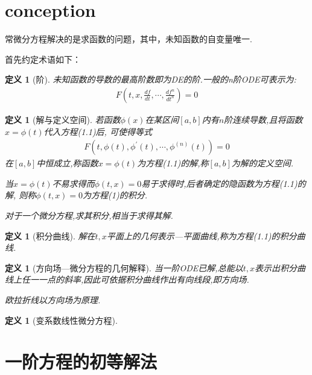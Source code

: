 \documentclass[12pt, a4paper, oneside]{ctexbook}
\newtheorem{definition}[theorem]{定义}
\begin{document}
\section{conception}
    常微分方程解决的是求函数的问题，其中，未知函数的自变量唯一.\par
    首先约定术语如下：
    \begin{definition}[阶]
        未知函数的导数的最高阶数即为DE的阶.一般的n阶ODE可表示为:
        \begin{align}
            F(t,x,\frac{df}{dt},\cdots,\frac{df^n}{dt^n})=0
        \end{align}
    \end{definition}
    \begin{definition}[解与定义空间]
        若函数$\phi(x)$在某区间$[a,b]$内有$n$阶连续导数,且将函数$x= \phi(t)$代入方程(1.1)后,
        可使得等式
        \begin{align*}
            F(t,\phi(t),\phi^{'}(t),\cdots,\phi^{(n)} (t)) = 0
        \end{align*}
        在$[a,b]$中恒成立,称函数$ x= \phi(t) $为方程(1.1)的解,称$[a,b]$为解的定义空间.\par
        当$x= \phi(t)$不易求得而$ \phi(t,x)=0 $易于求得时,后者确定的隐函数为方程(1.1)的解,
        则称$ \phi(t,x) = 0 $为方程(1)的积分.\par
        对于一个微分方程,求其积分,相当于求得其解.

    \end{definition}
    \begin{definition}[积分曲线]
        解在$t,x$平面上的几何表示---平面曲线,称为方程(1.1)的积分曲线.
    \end{definition}
    \begin{definition}[方向场---微分方程的几何解释]
        当一阶ODE已解,总能以$t,x$表示出积分曲线上任一一点的斜率,因此可依据积分曲线作出有向线段,即方向场.\par
        欧拉折线以方向场为原理.
    \end{definition}
    \begin{definition}[变系数线性微分方程]
    \end{definition}
\section{一阶方程的初等解法}
\end{document}
